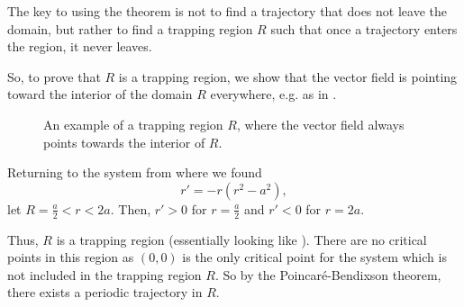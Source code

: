 \begin{remark}
	The key to using the theorem is not to find a trajectory that does not leave the domain, but rather to find a trapping region $R$ such that once a trajectory enters the region, it never leaves.
	
	So, to prove that $R$ is a trapping region, we show that the vector field is pointing toward the interior of the domain $R$ everywhere, e.g. as in .
\end{remark}

\begin{figure}[!ht]
	\centering
	\caption{An example of a trapping region $R$, where the vector field always points towards the interior of $R$.}
	\label{fig:trappingregion}
\end{figure}

\begin{eg}
	Returning to the system from  where we found
	\[
	r' = -r(r^2 - a^2),
	\]
	let $R = {\frac{a}{2}<r<2a}$. Then, $r' > 0$ for $r = \frac{a}{2}$ and $r'<0$ for $r = 2a$.
	
	Thus, $R$ is a trapping region (essentially looking like ). There are no critical points in this region as $(0,0)$ is the only critical point for the system which is not included in the trapping region $R$. So by the Poincaré-Bendixson theorem, there exists a periodic trajectory in $R$.
\end{eg}

